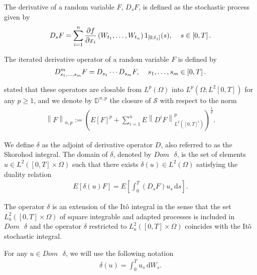 \documentclass[a4paper,10pt]{article}
\renewcommand{\d}{\,\mathrm{d}}
\newcommand{\1}{\mathbf{1}}
\begin{document}
\medbreak

The derivative of a random variable $F$, $D_{s}F$, is defined as the stochastic process given by
\begin{eqnarray*}
D_{s}F = \sum^{n}_{i=1} \frac{\partial f}{\partial x_{i}}\left(W_{t_{1}}, \ldots, W_{t_{n}}\right)1_{\left[0, t_{j}\right]}(s), \hspace{0.4cm} s \in \left[0,T\right].
\end{eqnarray*}

The iterated derivative operator of a random variable $F$ is defined by
\begin{eqnarray*}
D^{m}_{s_{1}, \ldots, s_{m}} F = D_{s_{1}} \cdots D_{s_{m}}F, \hspace{0.4cm} s_{1}, \ldots, s_{m} \in \left[0,T\right].
\end{eqnarray*}

\cite{Nualart} stated that these operators are closable from $L^{p}(\Omega)$ into $L^{p}(\Omega; L^{2}\left[0,T\right])$ for any $p\geq1$, and we denote by $\mathbb{D}^{n,p}$ the closure of $\mathcal{S}$ with respect to the norm
\begin{eqnarray*}
\left\|F\right\|_{n,p} := \left(E\left[F\right]^{p} + \sum^{n}_{i=1} E\left\|D^{i} F\right\|^{p}_{L^{2}\left(\left[0,T\right]^{i}\right)} \right)^{\frac{1}{p}}.
\end{eqnarray*}

\medbreak 

We define $\delta$ as the adjoint of derivative operator $D$, also referred to as the Skorohod integral. The domain of $\delta$, denoted by $Dom\text{ }\delta$, is the set of elements $u \in L^{2}([0,T] \times \Omega)$ such that there exists $\delta(u) \in L^{2}(\Omega)$ satisfying the duality relation
\begin{eqnarray*}
E\left[\delta(u) F \right] = E\left[\int^{T}_{0} \left(D_{s} F\right) u_{s} \d s\right].
\end{eqnarray*}

The operator $\delta$ is an extension of the Itô integral in the sense that the set $L^{2}_{a}([0,T] \times \Omega)$ of square integrable and adapted processes is included in $Dom\text{ }\delta$ and the operator $\delta$ restricted to $L^{2}_{a}([0,T] \times \Omega)$ coincides with the Itô stochastic integral.

\medbreak

For any $u \in Dom\text{ }\delta$, we will use the following notation
\begin{eqnarray*}
\delta(u)=\int^{T}_{0}u_{s}\d W_{s}.
\end{eqnarray*}
\end{document}
